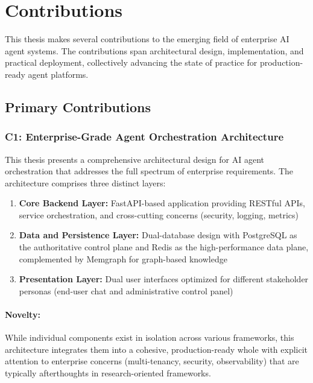 
\section{Contributions}
\label{sec:contributions}

This thesis makes several contributions to the emerging field of enterprise AI agent systems. The contributions span architectural design, implementation, and practical deployment, collectively advancing the state of practice for production-ready agent platforms.

\subsection{Primary Contributions}

\subsubsection{C1: Enterprise-Grade Agent Orchestration Architecture}

This thesis presents a comprehensive architectural design for AI agent orchestration that addresses the full spectrum of enterprise requirements. The architecture comprises three distinct layers:

\begin{enumerate}
    \item \textbf{Core Backend Layer:} FastAPI-based application providing RESTful APIs, service orchestration, and cross-cutting concerns (security, logging, metrics)
    
    \item \textbf{Data and Persistence Layer:} Dual-database design with PostgreSQL as the authoritative control plane and Redis as the high-performance data plane, complemented by Memgraph for graph-based knowledge
    
    \item \textbf{Presentation Layer:} Dual user interfaces optimized for different stakeholder personas (end-user chat and administrative control panel)
\end{enumerate}

\paragraph{Novelty:} While individual components exist in isolation across various frameworks, this architecture integrates them into a cohesive, production-ready whole with explicit attention to enterprise concerns (multi-tenancy, security, observability) that are typically afterthoughts in research-oriented frameworks.

